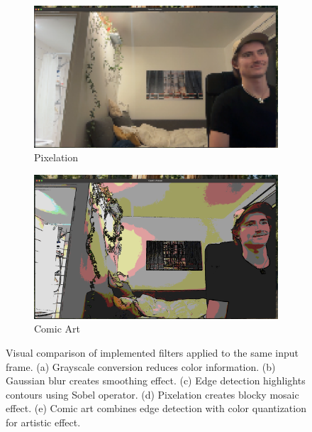 \documentclass[12pt,a4paper]{article}
\begin{document}
\begin{figure}[H]
    \begin{subfigure}[b]{0.32\textwidth}
        \centering
        \includegraphics[width=\textwidth]{filters/pixelatio.png}
        \caption{Pixelation}
        \label{fig:filter_pixelation}
    \end{subfigure}
    \hfill
    \begin{subfigure}[b]{0.32\textwidth}
        \centering
        \includegraphics[width=\textwidth]{filters/comic.png}
        \caption{Comic Art}
        \label{fig:filter_comic}
    \end{subfigure}

    \caption{Visual comparison of implemented filters applied to the same input frame. (a) Grayscale conversion reduces color information. (b) Gaussian blur creates smoothing effect. (c) Edge detection highlights contours using Sobel operator. (d) Pixelation creates blocky mosaic effect. (e) Comic art combines edge detection with color quantization for artistic effect.}
    \label{fig:filter_comparison}
\end{figure}
\end{document}
